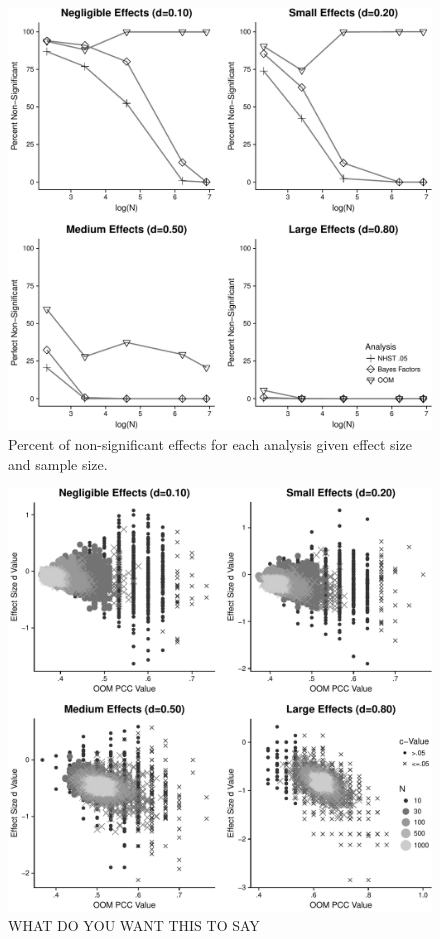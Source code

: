 \documentclass[english,man]{apa6}
\theoremstyle{definition}
\theoremstyle{definition}
\theoremstyle{definition}
\theoremstyle{remark}
\begin{document}
\begin{figure}
\centering
\includegraphics{alt_nhst_FINAL_files/figure-latex/effects-graph-nonsig-1.pdf}
\caption{\label{fig:effects-graph-nonsig}Percent of non-significant effects
for each analysis given effect size and sample size.}
\end{figure}

\begin{figure}
\centering
\includegraphics{alt_nhst_FINAL_files/figure-latex/effects-pcc-p-1.pdf}
\caption{\label{fig:effects-pcc-p}WHAT DO YOU WANT THIS TO SAY}
\end{figure}
\end{document}
